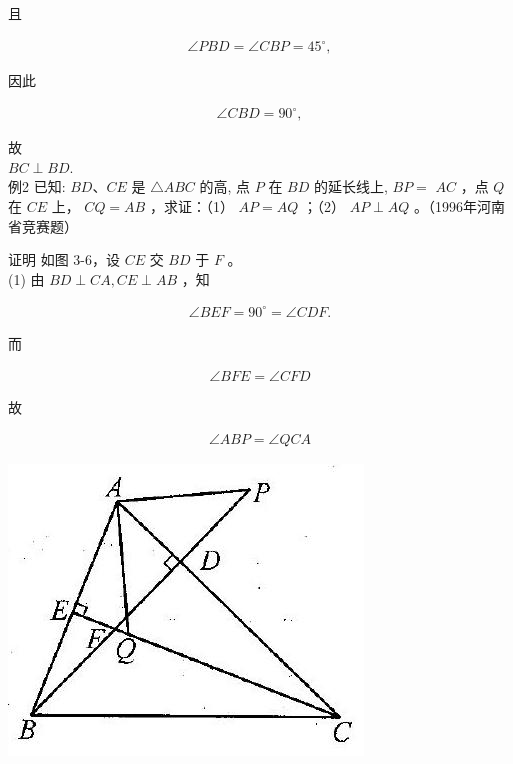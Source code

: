 \documentclass[10pt]{article}
\begin{document}
且

\begin{align*}
\angle P B D=\angle C B P=45^{\circ},
\end{align*}

因此

\begin{align*}
\angle C B D=90^{\circ},
\end{align*}

故\\
$B C \perp B D$.\\
例2 已知: $B D 、 C E$ 是 $\triangle A B C$ 的高, 点 $P$ 在 $B D$ 的延长线上, $B P=$ $A C$ ，点 $Q$ 在 $C E$ 上， $C Q=A B$ ，求证：（1） $A P=A Q$ ；（2） $A P \perp A Q$ 。（1996年河南省竞赛题）

证明 如图 3-6，设 $C E$ 交 $B D$ 于 $F$ 。\\
(1) 由 $B D \perp C A, C E \perp A B$ ，知

\begin{align*}
\angle B E F=90^{\circ}=\angle C D F .
\end{align*}

而

\begin{align*}
\angle B F E=\angle C F D
\end{align*}

故

\begin{align*}
\angle A B P=\angle Q C A
\end{align*}

\begin{center}
\includegraphics[max width=\textwidth]{2024_10_30_2c8f45efd4a519b08e1ag-026}
\end{center}
\end{document}
